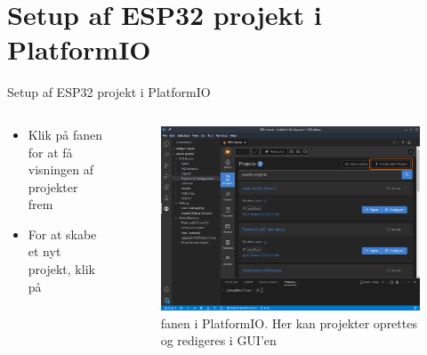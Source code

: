 \documentclass[aspectratio=169]{beamer}
\begin{document}
\section{Setup af ESP32 projekt i PlatformIO}
\begin{frame}
\end{frame}

\begin{frame}{Setup af ESP32 projekt i PlatformIO}
\begin{columns}
	\begin{column}{0.5\textwidth}
		\begin{textBox}
			\begin{itemize}
				\item Klik på fanen  for at få visningen af projekter frem
				\item For at skabe et nyt projekt, klik på 
			\end{itemize}
		\end{textBox}
	\end{column}
	\begin{column}{0.5\textwidth}
		\begin{figure}
  			\includegraphics[width=\textwidth,keepaspectratio=true]{assets/pictures/pio-project.png}
  			\caption{ fanen i PlatformIO. Her kan projekter oprettes og redigeres i GUI'en}
  			\label{fig:pio-project}
		\end{figure}
	\end{column}
\end{columns}
\end{frame}
\end{document}
